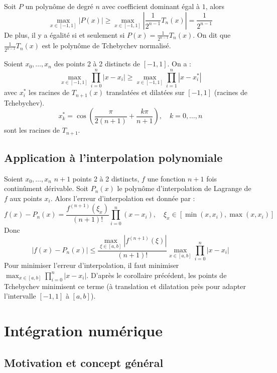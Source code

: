 \documentclass[oneside]{book}
\begin{document}
\begin{proposition}
Soit $P$ un polynôme de degré $n$ avec coefficient dominant égal à $1$, alors
\[
\max_{x \in [-1, 1]} |P(x)| \geq \max_{x \in [-1, 1]} \left|\frac{1}{2^{n-1}}T_n(x)\right| = \frac{1}{2^{n-1}}
\]
De plus, il y a égalité si et seulement si $P(x) = \frac{1}{2^{n-1}}T_n(x)$.
On dit que $\frac{1}{2^{n-1}}T_n(x)$ est le polynôme de Tchebychev normalisé.
\end{proposition}

\begin{corollary}
Soient $x_0, \dots, x_n$ des points 2 à 2 distincts de $[-1, 1]$.
On a :
\[
\max_{x \in [-1, 1]} \prod_{i=0}^{n} |x - x_i| \geq \max_{x \in [-1, 1]} \prod_{i=1}^{n} |x - x_i^*|
\]
avec $x_i^*$ les racines de $T_{n+1}(x)$ translatées et dilatées sur $[-1, 1]$ (racines de Tchebychev).
\[
x_k^* = \cos\left(\frac{\pi}{2(n+1)} + \frac{k\pi}{n+1}\right), \quad k = 0, \dots, n
\]
sont les racines de $T_{n+1}$.

\end{corollary}

\subsection{Application à l'interpolation polynomiale}

Soient $x_0, \dots, x_n$ $n+1$ points 2 à 2 distincts, $f$ une fonction $n+1$ fois continûment dérivable.
Soit $P_n(x)$ le polynôme d'interpolation de Lagrange de $f$ aux points $x_i$.
Alors l'erreur d'interpolation est donnée par :
\[
f(x) - P_n(x) = \frac{f^{(n+1)}(\xi_x)}{(n+1)!} \prod_{i=0}^{n} (x - x_i), \quad \xi_x \in [\min(x, x_i), \max(x, x_i)]
\]
Donc
\[
|f(x) - P_n(x)| \leq \frac{\max_{\xi \in [a, b]} |f^{(n+1)}(\xi)|}{(n+1)!} \max_{x \in [a, b]} \prod_{i=0}^{n} |x - x_i|
\]
Pour minimiser l'erreur d'interpolation, il faut minimiser $\max_{x \in [a, b]} \prod_{i=0}^{n} |x - x_i|$.
D'après le corollaire précédent, les points de Tchebychev minimisent ce terme (à translation et dilatation près pour adapter l'intervalle $[-1, 1]$ à $[a, b]$).

\section{Intégration numérique}

\subsection{Motivation et concept général}
\end{document}
